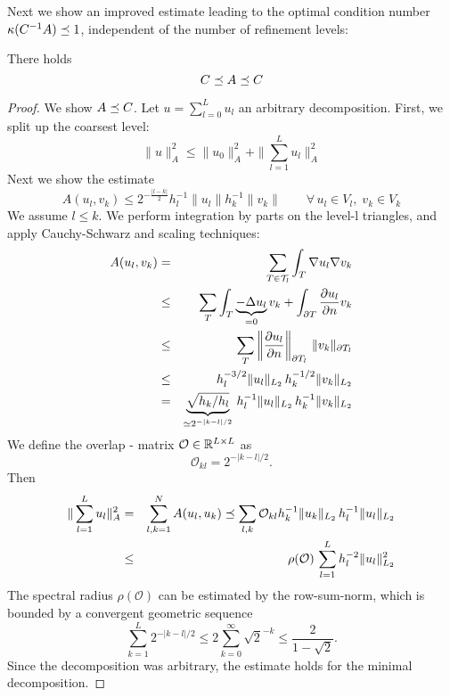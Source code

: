 Next we show an improved estimate leading to the optimal condition number $\kappa (C^{-1} A) \preceq 1$, independent of the number of refinement levels:
\begin{lemma} There holds
$$
C \preceq A \preceq C
$$
\end{lemma}
\begin{proof} We show $A \preceq C$. Let $u = \sum_{l=0}^L u_l$ an 
arbitrary decomposition. First, we split up the coarsest level:
$$
\| u \|_A^2 \leq \| u_0 \|_A^2 + \| \sum_{l=1}^L u_l \|_A^2
$$
Next we show the estimate
$$
A(u_l, v_k) \leq 2^{-\frac{|l-k|}{2}} h_l^{-1} \| u_l \| h_k^{-1} \| v_k \|
\qquad \forall \, u_l \in V_l, \; v_k \in V_k
$$
We assume $l \leq k$. We perform integration by parts on the level-l triangles, and apply Cauchy-Schwarz and scaling techniques:
\begin{eqnarray*}
A(u_l, v_k) & = & \sum_{T \in {\mathcal T}_l} \int_T \nabla u_l \nabla v_k \\
& \leq & \sum_T  \int_T \underbrace{-\Delta u_l}_{= 0} v_k + \int_{\partial T} \frac{\partial u_l}{\partial n} v_k \\
& \leq & \sum_T \left\| \frac{\partial u_l}{\partial n} \right\|_{\partial T_l} \, \| v_k \|_{\partial T_l} \\
& \leq & h_l^{-3/2} \| u_l \|_{L_2} \, h_k^{-1/2} \| v_k \|_{L_2} \\
& = & \underbrace{\sqrt{h_k/h_l}}_{\simeq 2^{-|k-l|/2}} \, h_l^{-1} \| u_l \|_{L_2} \, h_k^{-1} \| v_k \|_{L_2}
\end{eqnarray*}
We define the overlap - matrix ${\mathcal O} \in {\mathbb R}^{L \times L}$ as
$$
{\mathcal O}_{kl} = 2^{-|k-l|/2}.
$$
Then
\begin{eqnarray*}
\| \sum_{l=1}^L u_l \|_A^2 & = & 
\sum_{l,k=1}^N A(u_l, u_k) \preceq \sum_{l,k} {\mathcal O}_{kl} h_k^{-1} \| u_k \|_{L_2} \, h_l^{-1} \| u_l \|_{L_2} \\
& \leq & \rho (\mathcal O) \, \sum_{l=1}^L h_l^{-2} \| u_l \|^2_{L_2}
\end{eqnarray*}
The spectral radius $\rho ({\mathcal O})$ can be estimated by the row-sum-norm, which is bounded by a convergent geometric sequence
$$
\sum_{k=1}^L 2^{-|k-l|/2} \leq 2 \sum_{k=0}^\infty \sqrt{2}^{-k} 
\leq \frac{2}{1-\sqrt{2}}.
$$
Since the decomposition was arbitrary, the estimate holds for the minimal decomposition.


\bigskip


\end{proof}
